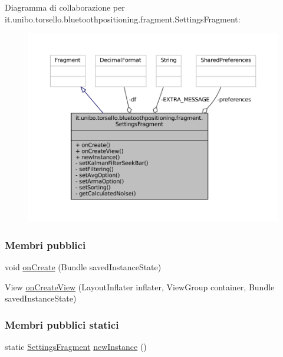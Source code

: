 Diagramma di collaborazione per it.\+unibo.\+torsello.\+bluetoothpositioning.\+fragment.\+Settings\+Fragment\+:
\nopagebreak
\begin{figure}[H]
\begin{center}
\leavevmode
\includegraphics[width=350pt]{classit_1_1unibo_1_1torsello_1_1bluetoothpositioning_1_1fragment_1_1SettingsFragment__coll__graph}
\end{center}
\end{figure}
\subsubsection*{Membri pubblici}
\begin{DoxyCompactItemize}
\item 
void \hyperlink{classit_1_1unibo_1_1torsello_1_1bluetoothpositioning_1_1fragment_1_1SettingsFragment_a7de90efb25e655078f5f8984f7c6d628_a7de90efb25e655078f5f8984f7c6d628}{on\+Create} (Bundle saved\+Instance\+State)
\item 
View \hyperlink{classit_1_1unibo_1_1torsello_1_1bluetoothpositioning_1_1fragment_1_1SettingsFragment_ac1c9d47777382cc2c74b7b1cf3d6ccd7_ac1c9d47777382cc2c74b7b1cf3d6ccd7}{on\+Create\+View} (Layout\+Inflater inflater, View\+Group container, Bundle saved\+Instance\+State)
\end{DoxyCompactItemize}
\subsubsection*{Membri pubblici statici}
\begin{DoxyCompactItemize}
\item 
static \hyperlink{classit_1_1unibo_1_1torsello_1_1bluetoothpositioning_1_1fragment_1_1SettingsFragment}{Settings\+Fragment} \hyperlink{classit_1_1unibo_1_1torsello_1_1bluetoothpositioning_1_1fragment_1_1SettingsFragment_a4eb69c78cde2ba119eb62453688280f5_a4eb69c78cde2ba119eb62453688280f5}{new\+Instance} ()
\end{DoxyCompactItemize}
